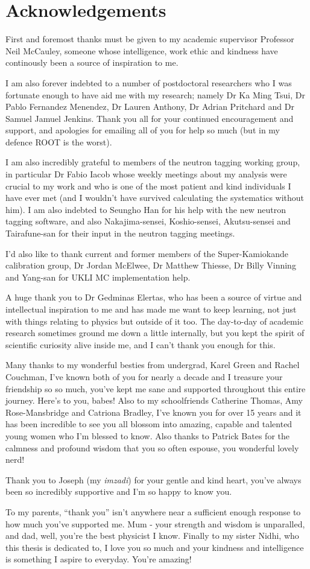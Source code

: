 \chapter*{Acknowledgements}
\thispagestyle{empty}
First and foremost thanks must be given to my academic supervisor Professor Neil McCauley, someone whose intelligence, work ethic and kindness have continously been a source of inspiration to me. 

I am also forever indebted to a number of postdoctoral researchers who I was fortunate enough to have aid me with my research; namely Dr Ka Ming Tsui, Dr Pablo Fernandez Menendez, Dr Lauren Anthony, Dr Adrian Pritchard and Dr Samuel Jamuel Jenkins. Thank you all for your continued encouragement and support, and apologies for emailing all of you for help so much (but in my defence ROOT is the worst).

I am also incredibly grateful to members of the neutron tagging working group, in particular Dr Fabio Iacob whose weekly meetings about my analysis were crucial to my work and who is one of the most patient and kind individuals I have ever met (and I wouldn't have survived calculating the systematics without him). I am also indebted to Seungho Han for his help with the new neutron tagging software, and also Nakajima-sensei, Koshio-sensei, Akutsu-sensei and Tairafune-san for their input in the neutron tagging meetings. 

I'd also like to thank current and former members of the Super-Kamiokande calibration group, Dr Jordan McElwee, Dr Matthew Thiesse, Dr Billy Vinning and Yang-san for UKLI MC implementation help. 
 
A huge thank you to Dr Gedminas Elertas, who has been a source of virtue and intellectual inspiration to me and has made me want to keep learning, not just with things relating to physics but outside of it too. The day-to-day of academic research sometimes ground me down a little internally, but you kept the spirit of scientific curiosity alive inside me, and I can't thank you enough for this. 

Many thanks to my wonderful besties from undergrad, Karel Green and Rachel Couchman, I've known both of you for nearly a decade and I treasure your friendship so so much, you've kept me sane and supported throughout this entire journey. Here's to you, babes!
Also to my schoolfriends Catherine Thomas, Amy Rose-Mansbridge and Catriona Bradley, I've known you for over 15 years and it has been incredible to see you all blossom into amazing, capable and talented young women who I'm blessed to know. Also thanks to Patrick Bates for the calmness and profound wisdom that you so often espouse, you wonderful lovely nerd! 

Thank you to Joseph (my \textit{imzadi}) for your gentle and kind heart, you've always been so incredibly supportive and I'm so happy to know you.  

To my parents, ``thank you'' isn't anywhere near a sufficient enough response to how much you've supported me. Mum - your strength and wisdom is unparalled, and dad, well, you're the best physicist I know. Finally to my sister Nidhi, who this thesis is dedicated to, I love you so much and your kindness and intelligence is something I aspire to everyday. You're amazing! 
